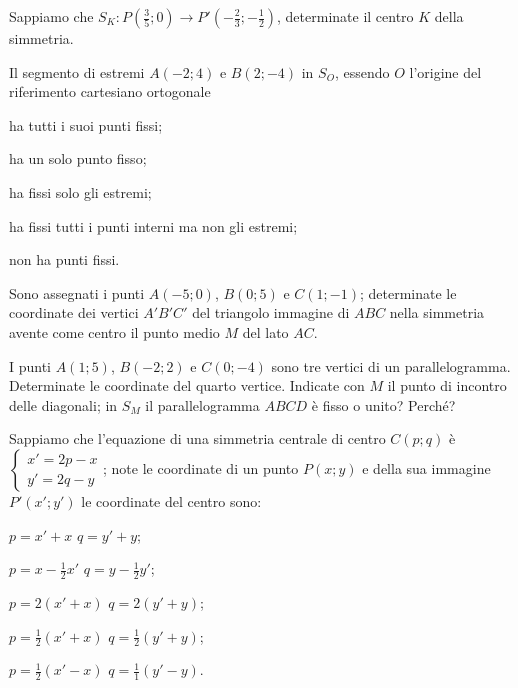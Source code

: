 \begin{esercizio}
\label{ese:8.7}
Sappiamo che $S_K:P\left(\frac{3}{5};0\right) \rightarrow P'\left(-\frac{2}{3};-\frac{1}{2}\right)$, determinate il centro $K$ della simmetria. 
\end{esercizio}

\begin{esercizio}
\label{ese:8.8}
Il segmento di estremi $A(-2;4)$ e $B(2;-4)$ in $S_O$, essendo $O$ l'origine del riferimento cartesiano ortogonale
\begin{enumeratea}
\item ha tutti i suoi punti fissi;
\item ha un solo punto fisso;
\item ha fissi solo gli estremi;
\item ha fissi tutti i punti interni ma non gli estremi;
\item non ha punti fissi.
\end{enumeratea}
\end{esercizio}

\begin{esercizio}
\label{ese:8.9}
Sono assegnati i punti $A(-5;0)$, $B(0;5)$ e $C(1;-1)$; determinate le coordinate dei vertici $A'B'C'$ del triangolo immagine di $ABC$ nella simmetria avente come centro il punto medio $M$ del lato $AC$.
\end{esercizio}

\begin{esercizio}
\label{ese:8.10}
I punti $A(1;5)$, $B(-2;2)$ e $C(0;-4)$ sono tre vertici di un parallelogramma. Determinate le coordinate del quarto vertice. Indicate con $M$ il punto di incontro delle diagonali; in $S_M$ il parallelogramma $ABCD$ è fisso o unito? Perché?
\end{esercizio}

\begin{esercizio}
\label{ese:8.11}
Sappiamo che l'equazione di una simmetria centrale di centro $C(p;q)$ è $\begin{cases}x'=2p-x\\y'=2q-y\end{cases}$; note le coordinate di un punto $P(x;y)$ e della sua immagine $P'(x';y')$ le coordinate del centro sono:
\begin{enumeratea}
\item $p=x'+x$ $q=y'+y$;
\item $p=x-\frac{1}{2}x'$ $q=y-\frac{1}{2}y'$;
\item $p=2(x'+x)$ $q=2(y'+y)$;
\item $p=\frac{1}{2}(x'+x)$ $q=\frac{1}{2}(y'+y)$;
\item $p=\frac{1}{2}(x'-x)$ $q=\frac{1}{1}(y'-y)$.
\end{enumeratea}
\end{esercizio}

